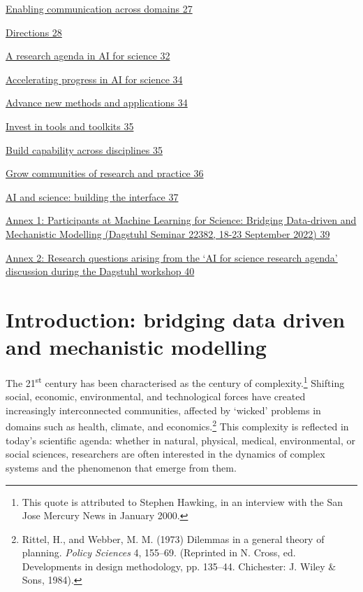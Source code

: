 \protect\hyperlink{enabling-communication-across-domains}{Enabling
communication across domains 27}

\protect\hyperlink{directions-2}{Directions 28}

\protect\hyperlink{a-research-agenda-in-ai-for-science}{A research
agenda in AI for science 32}

\protect\hyperlink{accelerating-progress-in-ai-for-science}{Accelerating
progress in AI for science 34}

\protect\hyperlink{advance-new-methods-and-applications}{Advance new
methods and applications 34}

\protect\hyperlink{invest-in-tools-and-toolkits}{Invest in tools and
toolkits 35}

\protect\hyperlink{build-capability-across-disciplines}{Build capability
across disciplines 35}

\protect\hyperlink{grow-communities-of-research-and-practice}{Grow
communities of research and practice 36}

\protect\hyperlink{ai-and-science-building-the-interface}{AI and
science: building the interface 37}

\protect\hyperlink{annex-1-participants-at-machine-learning-for-science-bridging-data-driven-and-mechanistic-modelling-dagstuhl-seminar-22382-18-23-september-2022}{Annex
1: Participants at Machine Learning for Science: Bridging Data-driven
and Mechanistic Modelling (Dagstuhl Seminar 22382, 18-23 September 2022)
39}

\protect\hyperlink{_Toc121762051}{Annex 2: Research questions arising
from the `AI for science research agenda' discussion during the Dagstuhl
workshop \protect\hyperlink{_Toc121762051}{40}}

\hypertarget{introduction-bridging-data-driven-and-mechanistic-modelling}{%
\section{Introduction: bridging data driven and mechanistic
modelling}\label{introduction-bridging-data-driven-and-mechanistic-modelling}}

The 21\textsuperscript{st} century has been characterised as the century
of complexity.\footnote{This quote is attributed to Stephen Hawking, in
  an interview with the San Jose Mercury News in January 2000.} Shifting
social, economic, environmental, and technological forces have created
increasingly interconnected communities, affected by `wicked' problems
in domains such as health, climate, and economics.\footnote{Rittel, H.,
  and Webber, M. M. (1973) Dilemmas in a general theory of planning.
  \emph{Policy Sciences} 4, 155--69. (Reprinted in N. Cross, ed.
  Developments in design methodology, pp. 135--44. Chichester: J. Wiley
  \& Sons, 1984).} This complexity is reflected in today's scientific
agenda: whether in natural, physical, medical, environmental, or social
sciences, researchers are often interested in the dynamics of complex
systems and the phenomenon that emerge from them.

